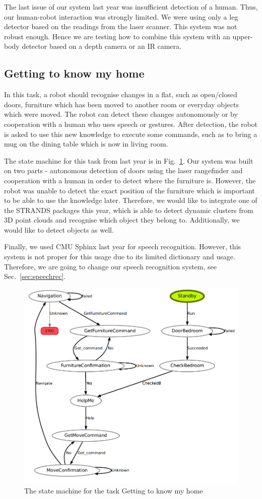 The last issue of our system last year was insufficient detection of a human. Thus, our human-robot interaction was strongly limited. 
We were using only a leg detector based on the readings from the laser scanner. 
This system was not robust enough. 
Hence we are testing how to combine this system with an upper-body detector based on a depth camera or an IR camera.

\subsection{Getting to know my home}

In this task, a robot should recognise changes in a flat, such as open/closed doors, furniture which has been moved to another room or everyday objects which were moved. 
The robot can detect these changes autonomously or by cooperation with a human who uses speech or gestures.
After detection, the robot is asked to use this new knowledge to execute some commands, such as to bring a mug on the dining table which is now in living room.

The state machine for this task from last year is in Fig.~\ref{fig:st1}.
Our system was built on two parts - autonomous detection of doors using the laser rangefinder and cooperation with a human in order to detect where the furniture is. 
 However, the robot was unable to detect the exact position of the furniture which is important to be able to use the knowledge later. 
Therefore, we would like to integrate one of the STRANDS packages this year, which is able to detect dynamic clusters from 3D point clouds and recognise which object they belong to. 
Additionally, we would like to detect objects as well.

Finally, we used CMU Sphinx last year for speech recognition. 
However, this system is not proper for this usage due to its limited dictionary and usage. 
Therefore, we are going to change our speech recognition system, see Sec.~\ref{sec:speechrec}.

\begin{figure}[!htb]
\centering
\includegraphics[width=3.in]{statemachine_t1.png}
\caption{The state machine for the task Getting to know my home}
\label{fig:st1}
\end{figure}

